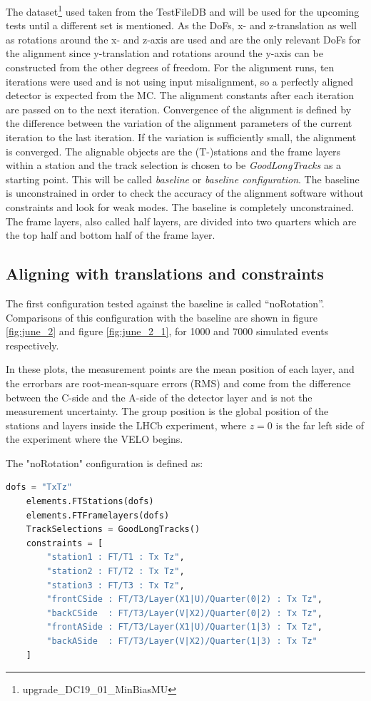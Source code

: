 The dataset\footnote{upgrade\_DC19\_01\_MinBiasMU} used taken from the TestFileDB\cite{testDB} and will be used for the upcoming tests until a different set is mentioned.
As the DoFs, x- and z-translation as well as rotations around the x- and z-axis are used and are the only relevant DoFs for the alignment since y-translation and rotations around the y-axis can be constructed from the other degrees of freedom.
For the alignment runs, ten iterations were used and is not using input misalignment, so a perfectly aligned detector is expected from the MC.
The alignment constants after each iteration are passed on to the next iteration.
Convergence of the alignment is defined by the difference between the variation of the alignment parameters of the current iteration to the last iteration. If the variation is sufficiently small, the alignment is converged.
The alignable objects are the (T-)stations and the frame layers within a station and the track selection is chosen to be \textit{GoodLongTracks} as a starting point. This will be called \textit{baseline} or \textit{baseline configuration}.
The baseline is unconstrained in order to check the accuracy of the alignment software without constraints and look for weak modes.
The baseline is completely unconstrained.
The frame layers, also called half layers, are divided into two quarters which are the top half and bottom half of the frame layer.

\subsection{Aligning with translations and constraints}
The first configuration tested against the baseline is called “noRotation”. Comparisons of this configuration with the baseline are shown in figure \ref{fig:june_2} and figure \ref{fig:june_2_1}, for 1000 and 7000 simulated events respectively.

In these plots, the measurement points are the mean position of each layer, and the errorbars are root-mean-square errors (RMS) and come from the difference between the C-side and the A-side of the detector layer and is not the measurement uncertainty.
The group position is the global position of the stations and layers inside the LHCb experiment, where $z = 0$ is the far left side of the experiment where the VELO begins.

The "noRotation" configuration is defined as:

\begin{lstlisting}[language=Python]
    dofs = "TxTz"
    elements.FTStations(dofs)
    elements.FTFramelayers(dofs)
    TrackSelections = GoodLongTracks()
    constraints = [
        "station1 : FT/T1 : Tx Tz",
        "station2 : FT/T2 : Tx Tz",
        "station3 : FT/T3 : Tx Tz",
        "frontCSide : FT/T3/Layer(X1|U)/Quarter(0|2) : Tx Tz",
        "backCSide  : FT/T3/Layer(V|X2)/Quarter(0|2) : Tx Tz",
        "frontASide : FT/T3/Layer(X1|U)/Quarter(1|3) : Tx Tz",
        "backASide  : FT/T3/Layer(V|X2)/Quarter(1|3) : Tx Tz"
    ]
\end{lstlisting}

